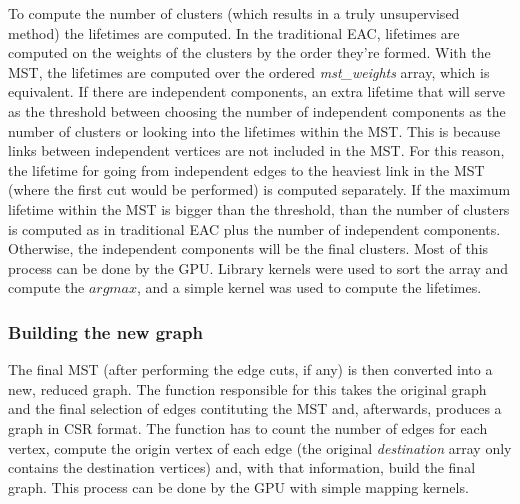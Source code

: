 To compute the number of clusters (which results in a truly unsupervised method) the lifetimes are computed.
In the traditional EAC, lifetimes are computed on the weights of the clusters by the order they're formed.
With the MST, the lifetimes are computed over the ordered \emph{mst\_weights} array, which is equivalent.
If there are independent components, an extra lifetime that will serve as the threshold between choosing the number of independent components as the number of clusters or looking into the lifetimes within the MST.
This is because links between independent vertices are not included in the MST.
For this reason, the lifetime for going from independent edges to the heaviest link in the MST (where the first cut would be performed) is computed separately.
If the maximum lifetime within the MST is bigger than the threshold, than the number of clusters is computed as in traditional EAC plus the number of independent components.
Otherwise, the independent components will be the final clusters.
Most of this process can be done by the GPU.
Library kernels were used to sort the array and compute the $arg max$, and a simple kernel was used to compute the lifetimes.

\subsubsection{Building the new graph}
The final MST (after performing the edge cuts, if any) is then converted into a new, reduced graph.
The function responsible for this takes the original graph and the final selection of edges contituting the MST and, afterwards, produces a graph in CSR format.
The function has to count the number of edges for each vertex, compute the origin vertex of each edge (the original \emph{destination} array only contains the destination vertices) and, with that information, build the final graph.
This process can be done by the GPU with simple mapping kernels.


